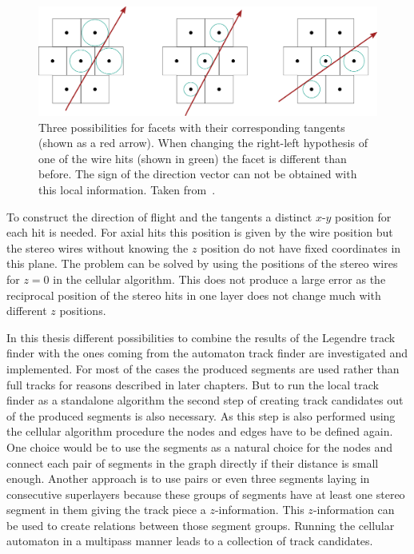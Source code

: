 \begin{figure}
  \centering
  \includegraphics[width=\linewidth]{figures/theory/facets.pdf}
  \caption[Facets used in the automaton track finder.]{Three possibilities for facets with their corresponding tangents (shown as a red arrow). When changing the right-left hypothesis of one of the wire hits (shown in green) the facet is different than before. The sign of the direction vector can not be obtained with this local information. Taken from~\cite{oliver}.}
  \label{fig-facets}
\end{figure}

To construct the direction of flight and the tangents a distinct $x$-$y$ position for each hit is needed. For axial hits this position is given by the wire position but the stereo wires without knowing the $z$ position do not have fixed coordinates in this plane. The problem can be solved by using the positions of the stereo wires for $z = 0$ in the cellular algorithm. This does not produce a large error as the reciprocal position of the stereo hits in one layer does not change much with different $z$ positions.

In this thesis different possibilities to combine the results of the Legendre track finder with the ones coming from the automaton track finder are investigated and implemented. For most of the cases the produced segments are used rather than full tracks for reasons described in later chapters. But to run the local track finder as a standalone algorithm the second step of creating track candidates out of the produced segments is also necessary. As this step is also performed using the cellular algorithm procedure the nodes and edges have to be defined again. One choice would be to use the segments as a natural choice for the nodes and connect each pair of segments in the graph directly if their distance is small enough. Another approach is to use pairs or even three segments laying in consecutive superlayers because these groups of segments have at least one stereo segment in them giving the track piece a $z$-information. This $z$-information can be used to create relations between those segment groups. Running the cellular automaton in a multipass manner leads to a collection of track candidates.


